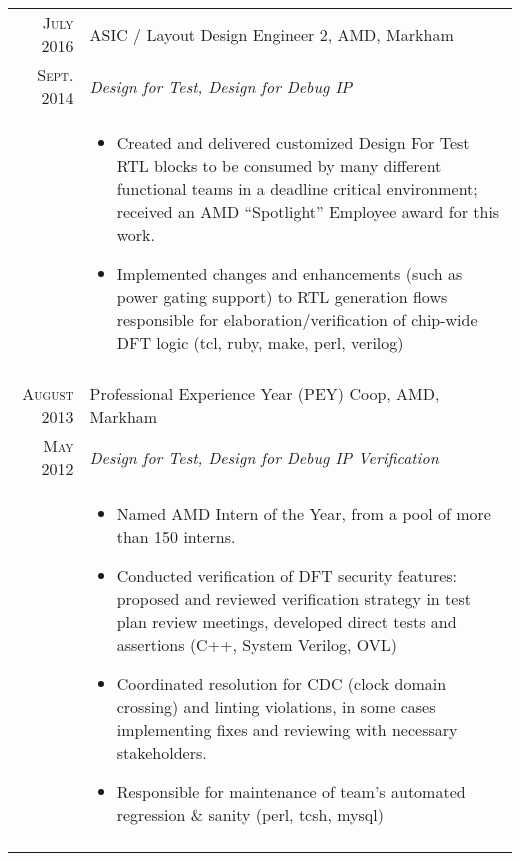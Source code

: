 \documentclass[a4paper,10pt]{article}
\begin{document}
\begin{longtable}{r|p{15cm}}
 \textsc{July 2016} & ASIC / Layout Design Engineer 2, \textsc{AMD}, Markham
\\\textsc{Sept. 2014}&\emph{Design for Test, Design for Debug IP}\\&\footnotesize{

\begin{itemize}\vspace*{-\baselineskip}
  \item Created and delivered customized Design For Test RTL blocks to be consumed by many different functional teams in a deadline critical environment; received an AMD “Spotlight” Employee award for this work. 
  \item Implemented changes and enhancements (such as power gating support) to RTL generation flows responsible for elaboration/verification of chip-wide DFT logic (tcl, ruby, make, perl, verilog)
\end{itemize}\vspace*{-\baselineskip}\vspace*{-\baselineskip}

}\\\multicolumn{2}{c}{} \\

 \textsc{August 2013} & Professional Experience Year (PEY) Coop, \textsc{AMD}, Markham 
\\\textsc{May 2012}    &\emph{Design for Test, Design for Debug IP Verification}\\
                                     &\footnotesize{
\begin{itemize}\vspace*{-\baselineskip}
  \item Named AMD Intern of the Year, from a pool of more than 150 interns.  
  \item Conducted verification of DFT security features: proposed and reviewed verification strategy in test plan review meetings, developed direct tests and assertions (C++, System Verilog, OVL)
  \item Coordinated resolution for CDC (clock domain crossing) and linting violations, in some cases implementing fixes and reviewing with necessary stakeholders.
  \item Responsible for maintenance of team's automated regression \& sanity (perl, tcsh, mysql) 
\end{itemize}\vspace*{-\baselineskip}\vspace*{-\baselineskip}
}\\\multicolumn{2}{c}{} \\


\end{longtable}
\end{document}
